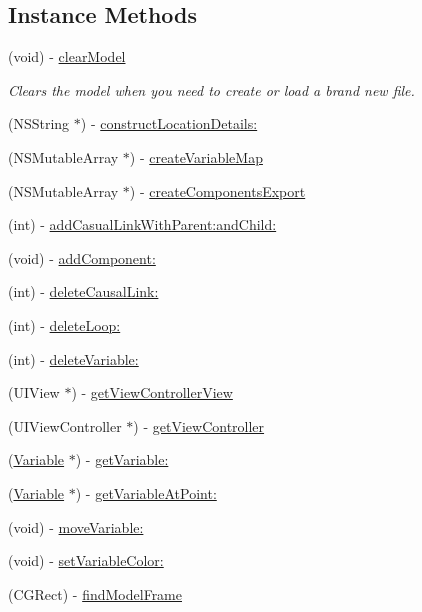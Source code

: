 \subsection*{Instance Methods}
\begin{DoxyCompactItemize}
\item 
(void) -\/ \hyperlink{interface_model_a1aa9ffd361768e65dff67ca34bece31e}{clear\-Model}
\begin{DoxyCompactList}\small\item\em Clears the model when you need to create or load a brand new file. \end{DoxyCompactList}\item 
(N\-S\-String $\ast$) -\/ \hyperlink{interface_model_a91805a3382a6a5e971b6ba41cf239d13}{construct\-Location\-Details\-:}
\item 
(N\-S\-Mutable\-Array $\ast$) -\/ \hyperlink{interface_model_a11e5b56412cf5554242194f97c3f0289}{create\-Variable\-Map}
\item 
(N\-S\-Mutable\-Array $\ast$) -\/ \hyperlink{interface_model_a4a8949c3a08298f59357fd8e23da5b4e}{create\-Components\-Export}
\item 
(int) -\/ \hyperlink{interface_model_adc802e370fc8db1828ab0720ccf1b421}{add\-Casual\-Link\-With\-Parent\-:and\-Child\-:}
\item 
(void) -\/ \hyperlink{interface_model_a47282c90df52a90537c270e38f7ab896}{add\-Component\-:}
\item 
(int) -\/ \hyperlink{interface_model_af6d6ffe8413a0199fa4810a378023496}{delete\-Causal\-Link\-:}
\item 
(int) -\/ \hyperlink{interface_model_aa4479c88b7241e0f24079c0318d37b54}{delete\-Loop\-:}
\item 
(int) -\/ \hyperlink{interface_model_a6a9cee44b5ea8954538199c1ceb07eff}{delete\-Variable\-:}
\item 
(U\-I\-View $\ast$) -\/ \hyperlink{interface_model_ab40d7b555b5fd0c7306b1035fa959158}{get\-View\-Controller\-View}
\item 
(U\-I\-View\-Controller $\ast$) -\/ \hyperlink{interface_model_aa36ee992fc98c9ef079d6b8954299479}{get\-View\-Controller}
\item 
(\hyperlink{interface_variable}{Variable} $\ast$) -\/ \hyperlink{interface_model_a9ccc4c0d1f6d72f49cdd2e105607d71a}{get\-Variable\-:}
\item 
(\hyperlink{interface_variable}{Variable} $\ast$) -\/ \hyperlink{interface_model_ab7e33b4b1a19e36620ba81922065ec22}{get\-Variable\-At\-Point\-:}
\item 
(void) -\/ \hyperlink{interface_model_aface1baeb2283622b46ce5725fbd3064}{move\-Variable\-:}
\item 
(void) -\/ \hyperlink{interface_model_a9417e1d438a60f39d050eb0dfc500a72}{set\-Variable\-Color\-:}
\item 
(C\-G\-Rect) -\/ \hyperlink{interface_model_a462b730c3f085149c45b1901fbb924ca}{find\-Model\-Frame}
\end{DoxyCompactItemize}
